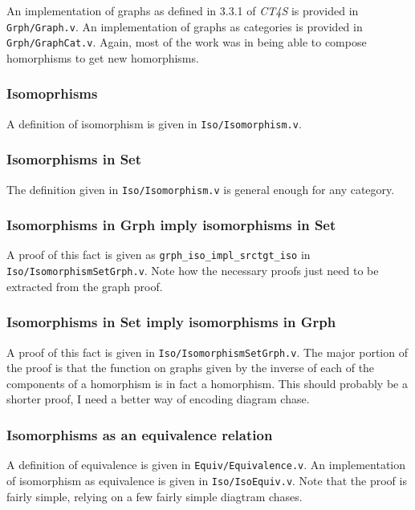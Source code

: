 \documentclass[12pt,twocolumn,oneside]{book}
\begin{document}
An implementation of graphs as defined in 3.3.1 of \emph{CT4S} is provided in
\texttt{Grph/Graph.v}. An implementation of graphs as categories is provided in
\texttt{Grph/GraphCat.v}. Again, most of the work was in being able to compose homorphisms
to get new homorphisms.

\subsubsection{Isomoprhisms}

A definition of isomorphism is given in \texttt{Iso/Isomorphism.v}.

\subsubsection{Isomorphisms in \textbf{Set}}

The definition given in \texttt{Iso/Isomorphism.v} is general enough for any category.

\subsubsection{Isomorphisms in \textbf{Grph} imply isomorphisms in \textbf{Set}}

A proof of this fact is given as \texttt{grph\_iso\_impl\_srctgt\_iso} in \texttt{Iso/IsomorphismSetGrph.v}.
Note how the necessary proofs just need to be extracted from the graph proof.

\subsubsection{Isomorphisms in \textbf{Set} imply isomorphisms in \textbf{Grph}}

A proof of this fact is given in \texttt{Iso/IsomorphismSetGrph.v}. The major portion of the
proof is that the function on graphs given by the inverse of each of the components
of a homorphism is in fact a homorphism. This should probably be a shorter proof,
I need a better way of encoding diagram chase.

\subsubsection{Isomorphisms as an equivalence relation}

A definition of equivalence is given in \texttt{Equiv/Equivalence.v}. An implementation
of isomorphism as equivalence is given in \texttt{Iso/IsoEquiv.v}. Note that the proof
is fairly simple, relying on a few fairly simple diagtram chases.
\end{document}
